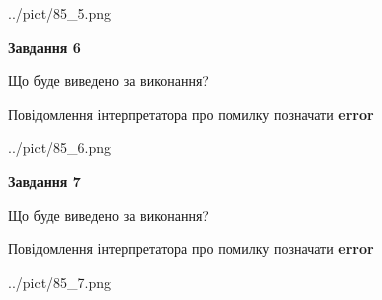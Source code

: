 \documentclass[10pt, ukrainian]{article}
\begin{document}
{\begin {large}
\begin{center}
	{../pict/85_5.png}
\end{center}
\newpage

{\begin {center}\textbf{Завдання 6}\end {center}}\par
Що буде виведено за виконання? \par
Повідомлення інтерпретатора про помилку позначати \textbf{error}

\begin{center}
	{../pict/85_6.png}
\end{center}
\newpage

{\begin {center}\textbf{Завдання 7}\end {center}}\par
Що буде виведено за виконання? \par
Повідомлення інтерпретатора про помилку позначати \textbf{error}

\begin{center}
	{../pict/85_7.png}
\end{center}
\newpage

\end {large}}
\end{document}
